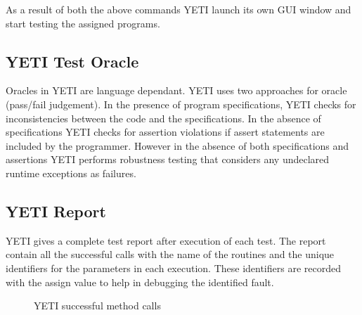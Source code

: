 As a result of both the above commands YETI launch its own GUI window and start testing the assigned programs. 

\subsection{YETI Test Oracle}
Oracles in YETI are language dependant. YETI uses two approaches for oracle (pass/fail judgement). In the presence of program specifications, YETI checks for inconsistencies between the code and the specifications. In the absence of specifications YETI checks for assertion violations if assert statements are included by the programmer. However in the absence of both specifications and assertions YETI performs robustness testing that considers any undeclared runtime exceptions as failures. 


\subsection{YETI Report}
YETI gives a complete test report after execution of each test. The report contain all the successful calls with the name of the routines and the unique identifiers for the parameters in each execution. These identifiers are recorded with the assign value to help in debugging the identified fault. 
\\
\begin{figure}[h]
	\centering
	\caption{YETI successful method calls}
\end{figure}

